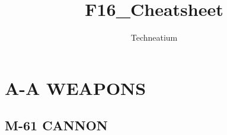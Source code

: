 \documentclass[fontInter]{TechCheck}
\title{F16_Cheatsheet}
\author{Techneatium}
\begin{document}
	

	\pagestyle{empty}
	\dominitoc
	\tableofcontents
	\cleardoublepage

	\setcounter{page}{1}
	\pagestyle{body}

	

	

	

	

	

	\chapter{A-A WEAPONS}
	\minitoc
	\cleardoublepage

	\section{M-61 CANNON}
\end{document}
